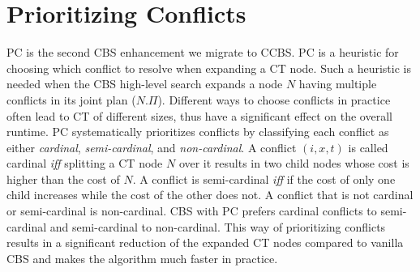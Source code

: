 \documentclass[letterpaper]{article} %
\newcommand{\cbs}{\ac{CBS}\xspace}
\newcommand{\icbs}{\ac{ICBS}\xspace}
\newcommand{\ccbs}{\ac{CCBS}\xspace}
\newcommand{\ct}{\ac{CT}\xspace}
\newcommand{\pc}{\ac{PC}\xspace}
\begin{document}
\section{Prioritizing Conflicts}







\acf{PC} \cite{BoyarskiFSSTBS15} is the second \cbs enhancement we migrate to \ccbs. 
\pc is a heuristic for choosing which conflict to resolve when expanding a \ct node. 
Such a heuristic is needed when the \cbs high-level search expands a node $N$ having multiple conflicts in its joint plan ($N.\Pi$). %
Different ways to choose conflicts in practice often lead to \ct of different sizes, 
thus have a significant effect on the overall runtime. 
\pc systematically prioritizes conflicts by classifying each conflict as either \emph{cardinal}, \emph{semi-cardinal}, and \emph{non-cardinal}. 
A conflict $(i,x,t)$ is called cardinal \emph{iff} splitting a \ct node $N$ over it results in two child nodes
whose cost is higher than the cost of $N$. 
A conflict is semi-cardinal \emph{iff} if the cost of only one child increases while the cost of the other does not. 
A conflict that is not cardinal or semi-cardinal is non-cardinal. 
\cbs with \pc prefers cardinal conflicts to semi-cardinal and semi-cardinal to non-cardinal.  
This way of prioritizing conflicts results in a significant reduction of the expanded \ct nodes compared to vanilla \cbs and makes the algorithm much faster in practice.
\end{document}
